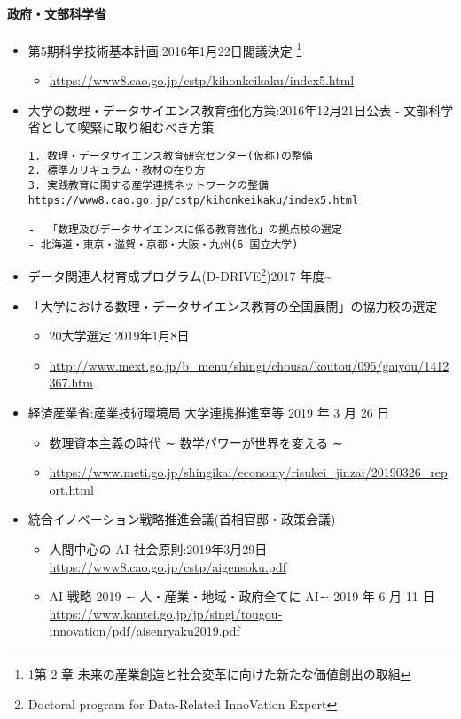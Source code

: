 \documentclass[
]{book}
\providecommand{\tightlist}{%
  \setlength{\itemsep}{0pt}\setlength{\parskip}{0pt}}
\theoremstyle{definition}
\theoremstyle{definition}
\theoremstyle{definition}
\theoremstyle{definition}
\theoremstyle{remark}
\begin{document}
\hypertarget{ux653fux5e9cux6587ux90e8ux79d1ux5b66ux7701}{%
\paragraph{政府・文部科学省}\label{ux653fux5e9cux6587ux90e8ux79d1ux5b66ux7701}}

\begin{itemize}
\item
  第5期科学技術基本計画:2016年1月22日閣議決定 \footnote{1第 2 章 未来の産業創造と社会変革に向けた新たな価値創出の取組}

  \begin{itemize}
  \tightlist
  \item
    \url{https://www8.cao.go.jp/cstp/kihonkeikaku/index5.html}
  \end{itemize}
\item
  大学の数理・データサイエンス教育強化方策:2016年12月21日公表
  - 文部科学省として喫緊に取り組むべき方策

\begin{verbatim}
1. 数理・データサイエンス教育研究センター(仮称)の整備
2. 標準カリキュラム・教材の在り方
3. 実践教育に関する産学連携ネットワークの整備         
https://www8.cao.go.jp/cstp/kihonkeikaku/index5.html

-  「数理及びデータサイエンスに係る教育強化」の拠点校の選定 
- 北海道・東京・滋賀・京都・大阪・九州(6 国立大学)
\end{verbatim}
\item
  データ関連人材育成プログラム(D-DRIVE\footnote{Doctoral program for Data-Related InnoVation Expert})2017 年度\textasciitilde{}
\item
  「大学における数理・データサイエンス教育の全国展開」の協力校の選定

  \begin{itemize}
  \tightlist
  \item
    20大学選定:2019年1月8日
  \item
    \url{http://www.mext.go.jp/b_menu/shingi/chousa/koutou/095/gaiyou/1412367.htm}
  \end{itemize}
\item
  経済産業省:産業技術環境局 大学連携推進室等 2019 年 3 月 26 日

  \begin{itemize}
  \item
    数理資本主義の時代 ∼ 数学パワーが世界を変える ∼
  \item
    \url{https://www.meti.go.jp/shingikai/economy/risukei_jinzai/20190326_report.html}
  \end{itemize}
\item
  統合イノベーション戦略推進会議(首相官邸・政策会議)

  \begin{itemize}
  \tightlist
  \item
    人間中心の AI 社会原則:2019年3月29日
    \url{https://www8.cao.go.jp/cstp/aigensoku.pdf}
  \item
    AI 戦略 2019 ∼ 人・産業・地域・政府全てに AI∼ 2019 年 6 月 11 日 \url{https://www.kantei.go.jp/jp/singi/tougou-innovation/pdf/aisenryaku2019.pdf}
  \end{itemize}
\end{itemize}
\end{document}
